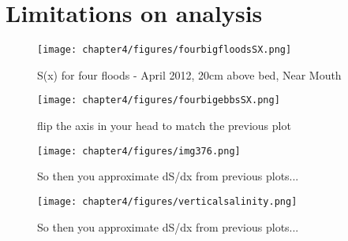\section{Limitations on analysis}



\begin{figure}
	\texttt{[image: chapter4/figures/fourbigfloodsSX.png]} 
\caption{S(x) for four floods - April 2012, 20cm above bed, Near Mouth} \label{fig:fourfloods}
\end{figure}


\begin{figure}
	\texttt{[image: chapter4/figures/fourbigebbsSX.png]} \caption{flip the axis in your head to match the previous plot} \label{fig:fourebbs}
\end{figure}


\begin{figure}
	\texttt{[image: chapter4/figures/img376.png]} \caption{So then you approximate dS/dx from previous plots...} \label{fig:fourebbs}
\end{figure}


\begin{figure}
	\texttt{[image: chapter4/figures/verticalsalinity.png]} \caption{So then you approximate dS/dx from previous plots...} \label{fig:fourebbs}
\end{figure}

